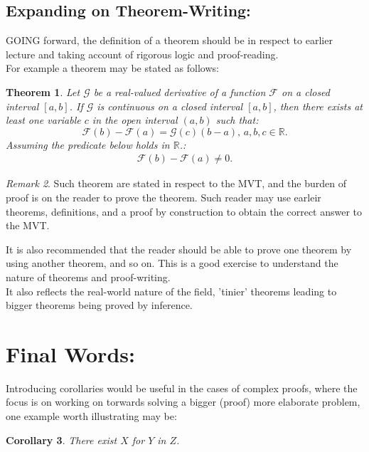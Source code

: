 \documentclass[10pt]{article}
\theoremstyle{plain}
\newtheorem{theorem}{Theorem}[section]
\newtheorem{corollary}[theorem]{Corollary}
\theoremstyle{definition}
\theoremstyle{remark}
\newtheorem{remark}[theorem]{Remark}
\begin{document}
\subsection{Expanding on Theorem-Writing:}

\lettrine[lines=2, lhang=0.1, loversize=0.2]{G}OING forward, the definition of a theorem should be in respect to earlier lecture and taking account of rigorous logic and proof-reading.\\
For example a theorem may be stated as follows:

\begin{theorem}
	Let $\mathcal{G}$ be a real-valued derivative of a function $\mathcal{F}$ on a closed interval $[a, b]$. If $\mathcal{G}$ is continuous on a closed interval $[a, b]$, then there exists at least one variable $c$ in the open interval $(a, b)$ such that:
	\begin{equation}
		\mathcal{F}(b) - \mathcal{F}(a) = \mathcal{G}(c)(b - a), \, a, b, c \in \mathbb{R}.
	\end{equation}
	Assuming the predicate below holds in $\mathbb{R}$.:
	\begin{align*}
	\mathcal{F}(b) - \mathcal{F}(a) \neq 0.
	\end{align*}
\end{theorem}
\begin{remark}
	Such theorem are stated in respect to the MVT, and the burden of proof is on the reader to prove the theorem. Such reader may use earleir theorems, definitions, and a proof by construction to obtain the correct answer to the MVT.
\end{remark}
It is also recommended that the reader should be able to prove one theorem by using another theorem, and so on. This is a good exercise to understand the nature of theorems and proof-writing.\\
It also reflects the real-world nature of the field, 'tinier' theorems leading to bigger theorems being proved by inference. 

\section{Final Words:}

Introducing corollaries would be useful in the cases of complex proofs, where the focus is on working on torwards solving a bigger (proof) more elaborate problem, one example worth illustrating may be:

\begin{corollary}
	There exist $X$ for $Y$ in $Z$.
\end{corollary}
\end{document}
